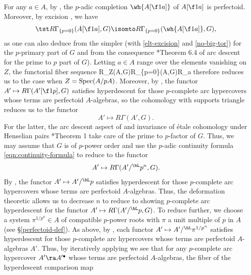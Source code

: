 \bpf
For any $a \in A$, by , the $p$-adic completion $\wh{A[\f1a]}$ of $A[\f1a]$ is perfectoid. Moreover, by excision , we have
\[
\tst R\Gamma_{\{p=0\}}(A[\f 1a],G) \isomto R\Gamma_{\{p=0\}}(\wh{A[\f 1a]},G),
\]
as one can also deduce from the simpler  (with \eqref{elt-excision} and \eqref{no-big-tor}) for the $p$-primary part of $G$ and from the consequence \cite{BM20}*{Theorem 6.4} of arc descent  for the prime to $p$ part of $G$).
 Letting $a \in A$ range over the elements vanishing on $Z$, the functorial fiber sequence
\be \label{eqn:p-for-Z}
\tst R\Gamma_Z(A,G)\to R\Gamma_{\{p=0\}}(A,G)\to R\lim_a 
\ee
therefore reduces us to the case when $Z = \operatorname{Spec}(A/pA)$. Moreover, by , the functor $A' \mapsto R\Gamma(A'[\f 1p], G)$ satisfies hyperdescent for those $p$-complete arc hypercovers whose terms are perfectoid $A$-algebras, so the cohomology with supports triangle reduces us to the functor
\[
A' \mapsto R\Gamma(A', G).
\]
For the latter, the arc descent aspect of  and invariance of \'{e}tale cohomology under Henselian pairs \cite{Gab94a}*{Theorem 1} take care of the prime to $p$-factor of $G$. Thus, we may assume that $G$ is of $p$-power order and use the $p$-adic continuity formula \eqref{eqn:continuity-formula} to reduce to the functor
\[
A' \mapsto R\Gamma(A'/^\bL p^n, G).
\]
By , the functor $A' \mapsto A'/^\bL p$ satisfies hyperdescent for those $p$-complete arc hypercovers whose terms are perfectoid $A$-algebras. Thus, the deformation theoretic  %
allows us to decrease $n$ to reduce to showing $p$-complete arc hyperdescent for the functor $A' \mapsto R\Gamma(A'/^\bL p, G)$. To reduce further, we choose a system $\pi^{1/p^n} \in A$ of compatible $p$-power roots with $\pi$ a unit multiple of $p$ in $A$ (see \S\ref{perfectoid-def}). As above, by , each functor $A' \mapsto A'/^\bL \pi^{1/p^n}$ satisfies hyperdescent for those $p$-complete arc hypercovers whose terms are perfectoid $A$-algebras $A'$. Thus, by iteratively applying  we see that for any $p$-complete arc hypercover $A' \ra A'^\bullet$ whose terms are perfectoid $A$-algebras, the fiber of the hyperdescent comparison map
